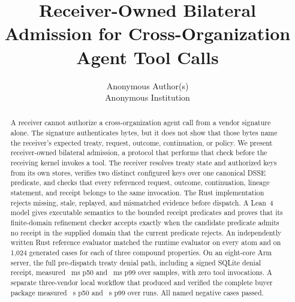 \documentclass[letterpaper,twocolumn,10pt]{article}
\date{}
\title{\Large \bf Receiver-Owned Bilateral Admission for Cross-Organization Agent Tool Calls}
\author{
{\rm Anonymous Author(s)}\\
Anonymous Institution
}
\begin{document}
\maketitle

\begin{abstract}
A receiver cannot authorize a cross-organization agent call from a vendor
signature alone. The signature authenticates bytes, but it does not show that
those bytes name the receiver's expected treaty, request, outcome,
continuation, or policy. We
present receiver-owned bilateral admission, a protocol that performs that
check before the receiving kernel invokes a tool. The receiver resolves treaty
state and authorized keys from its own stores, verifies two distinct
configured keys over one canonical DSSE predicate, and checks that every
referenced request, outcome, continuation, lineage statement, and receipt
belongs to the same invocation. The Rust implementation rejects missing,
stale, replayed, and mismatched evidence before dispatch. A Lean~4 model gives
executable semantics to the bounded receipt predicates and proves that its
finite-domain refinement checker accepts exactly when the candidate predicate
admits no receipt in the supplied domain that the current predicate rejects. An
independently written Rust reference evaluator matched the runtime
evaluator on every atom and on 1,024 generated cases for each of three
compound properties. On an eight-core Arm server, the full pre-dispatch treaty
denial path, including a signed SQLite denial receipt, measured
\PSPredispatchDenyPFiftyMs~ms p50 and
\PSPredispatchDenyPNinetyNineMs~ms p99 over
\PSCriterionSampleCount{} samples, with zero tool invocations. A separate
three-vendor local workflow that produced and verified the complete buyer
package measured \PSBuyerWorkflowPFiftySec~s p50 and
\PSBuyerWorkflowPNinetyNineSec~s p99 over \PSPathSampleCount{} runs. All
\PSThreatCaseCount{} named negative cases passed.
\end{abstract}














\end{document}
